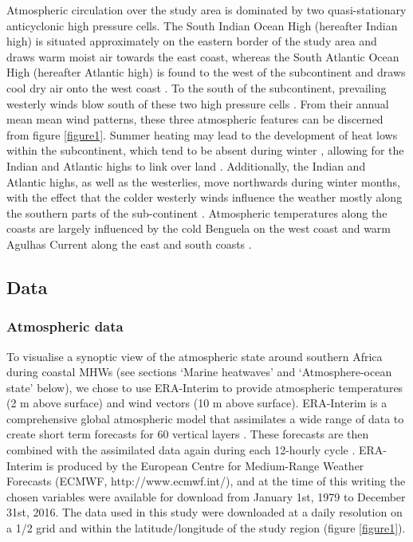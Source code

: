 \documentclass[utf8]{frontiersSCNS}
\begin{document}
Atmospheric circulation over the study area is dominated by two quasi-stationary anticyclonic high pressure cells. The South Indian Ocean High (hereafter Indian high) is situated approximately on the eastern border of the study area and draws warm moist air towards the east coast, whereas the South Atlantic Ocean High (hereafter Atlantic high) is found to the west of the subcontinent and draws cool dry air onto the west coast \citep{vanHeerden1998}. To the south of the subcontinent, prevailing westerly winds blow south of these two high pressure cells \citep{vanHeerden1998}. From their annual mean mean wind patterns, these three atmospheric features can be discerned from figure \ref{figure1}. Summer heating may lead to the development of heat lows within the subcontinent, which tend to be absent during winter \citep{Tyson2000}, allowing for the Indian and Atlantic highs to link over land \citep{vanHeerden1998}. Additionally, the Indian and Atlantic highs, as well as the westerlies, move northwards during winter months, with the effect that the colder westerly winds influence the weather mostly along the southern parts of the sub-continent \citep{vanHeerden1998}. Atmospheric temperatures along the coasts are largely influenced by the cold Benguela on the west coast and warm Agulhas Current along the east and south coasts \citep{vanHeerden1998}.




\subsection{Data}
\subsubsection{Atmospheric data}
To visualise a synoptic view of the atmospheric state around southern Africa during coastal MHWs (see sections `Marine heatwaves' and `Atmosphere-ocean state' below), we chose to use ERA-Interim to provide atmospheric temperatures (2 m above surface) and wind vectors (10 m above surface). ERA-Interim is a comprehensive global atmospheric model that assimilates a wide range of data to create short term forecasts for 60 vertical layers \citep{Dee2011}. These forecasts are then combined with the assimilated data again during each 12-hourly cycle \citep{Dee2011}. ERA-Interim is produced by the European Centre for Medium-Range Weather Forecasts (ECMWF, http://www.ecmwf.int/), and at the time of this writing the chosen variables were available for download from January 1st, 1979 to December 31st, 2016. The data used in this study were downloaded at a daily resolution on a 1/2\degree \: grid and within the latitude/longitude of the study region (figure \ref{figure1}).
\end{document}
